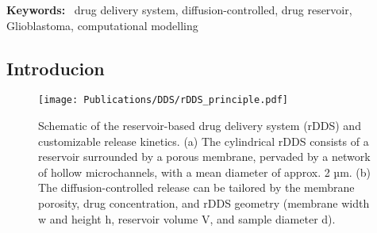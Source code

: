 \textbf{Keywords: }~drug delivery system, diffusion-controlled, drug reservoir, Glioblastoma, computational modelling

\subsection{Introducion}
\begin{figure}[h!]
  \centering
  \texttt{[image: Publications/DDS/rDDS\_principle.pdf]}
  \caption{Schematic of the reservoir-based drug delivery system (rDDS) and customizable release kinetics. (a) The cylindrical rDDS consists of a reservoir surrounded by a porous membrane, pervaded by a network of hollow microchannels, with a mean diameter of approx. 2 µm. (b) The diffusion-controlled release can be tailored by the membrane porosity, drug concentration, and rDDS geometry (membrane width w and height h, reservoir volume V, and sample diameter d).}
  \label{fig:rDDS_principle}
\end{figure}

